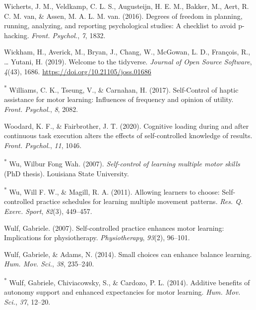 \documentclass[
  english,
  man, donotrepeattitle,floatsintext]{apa7}
\newlength{\cslhangindent}
\newlength{\cslentryspacingunit} %
\newenvironment{CSLReferences}[2] %
 {%
  \setlength{\parindent}{0pt}
  \ifodd #1
  \let\oldpar\par
  \def\par{\hangindent=\cslhangindent\oldpar}
  \fi
  \setlength{\parskip}{#2\cslentryspacingunit}
 }%
 {}
\begin{document}
\begin{CSLReferences}{1}{0}
\leavevmode{}%
Wicherts, J. M., Veldkamp, C. L. S., Augusteijn, H. E. M., Bakker, M., Aert, R. C. M. van, \& Assen, M. A. L. M. van. (2016). Degrees of freedom in planning, running, analyzing, and reporting psychological studies: A checklist to avoid p-hacking. \emph{Front. Psychol.}, \emph{7}, 1832.

\leavevmode{}%
Wickham, H., Averick, M., Bryan, J., Chang, W., McGowan, L. D., François, R., \ldots{} Yutani, H. (2019). Welcome to the {tidyverse}. \emph{Journal of Open Source Software}, \emph{4}(43), 1686. \url{https://doi.org/10.21105/joss.01686}

\leavevmode{}%
\textsuperscript{*} Williams, C. K., Tseung, V., \& Carnahan, H. (2017). {Self-Control} of haptic assistance for motor learning: Influences of frequency and opinion of utility. \emph{Front. Psychol.}, \emph{8}, 2082.

\leavevmode{}%
Woodard, K. F., \& Fairbrother, J. T. (2020). Cognitive loading during and after continuous task execution alters the effects of self-controlled knowledge of results. \emph{Front. Psychol.}, \emph{11}, 1046.

\leavevmode{}%
\textsuperscript{*} Wu, Wilbur Fong Wah. (2007). \emph{Self-control of learning multiple motor skills} (PhD thesis). Louisiana State University.

\leavevmode{}%
\textsuperscript{*} Wu, Will F. W., \& Magill, R. A. (2011). Allowing learners to choose: Self-controlled practice schedules for learning multiple movement patterns. \emph{Res. Q. Exerc. Sport}, \emph{82}(3), 449--457.

\leavevmode{}%
Wulf, Gabriele. (2007). Self-controlled practice enhances motor learning: Implications for physiotherapy. \emph{Physiotherapy}, \emph{93}(2), 96--101.

\leavevmode{}%
Wulf, Gabriele, \& Adams, N. (2014). Small choices can enhance balance learning. \emph{Hum. Mov. Sci.}, \emph{38}, 235--240.

\leavevmode{}%
\textsuperscript{*} Wulf, Gabriele, Chiviacowsky, S., \& Cardozo, P. L. (2014). Additive benefits of autonomy support and enhanced expectancies for motor learning. \emph{Hum. Mov. Sci.}, \emph{37}, 12--20.


\end{CSLReferences}
\end{document}
